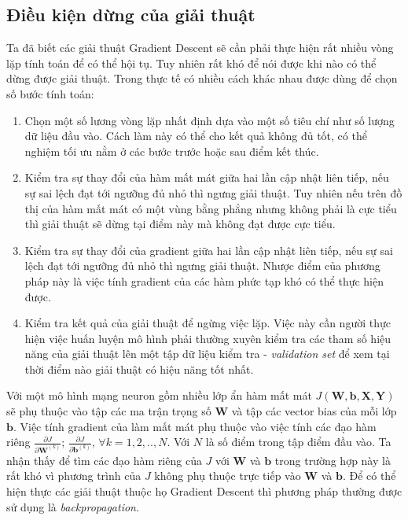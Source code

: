 \subsection{Điều kiện dừng của giải thuật}
Ta đã biết các giải thuật Gradient Descent sẽ cần phải thực hiện rất nhiều vòng lặp tính toán để có thể hội tụ. Tuy nhiên rất khó để nói được khi nào có thể dừng được giải thuật. Trong thực tế có nhiều cách khác nhau được dùng để chọn số bước tính toán:
\begin{enumerate}
	\item Chọn một số lương vòng lặp nhất định dựa vào một số tiêu chí như số lượng dữ liệu đầu vào. Cách làm này có thể cho kết quả không đủ tốt, có thể nghiệm tối ưu nằm ở các bước trước hoặc sau điểm kết thúc.
	\item Kiểm tra sự thay đổi của hàm mất mát giữa hai lần cập nhật liên tiếp, nếu sự sai lệch đạt tới ngưỡng đủ nhỏ thì ngưng giải thuật. Tuy nhiên nếu trên đồ thị của hàm mất mát có một vùng bằng phẳng nhưng không phải là cực tiểu thì giải thuật sẽ dừng tại điểm này mà không đạt được cực tiểu.
	\item Kiểm tra sự thay đổi của gradient giữa hai lần cập nhật liên tiếp, nếu sự sai lệch đạt tới ngưỡng đủ nhỏ thì ngưng giải thuật. Nhược điểm của phương pháp này là việc tính gradient của các hàm phức tạp khó có thể thực hiện được.
	\item Kiểm tra kết quả của giải thuật để ngừng việc lặp. Việc này cần người thực hiện việc huấn luyện mô hình phải thường xuyên kiểm tra các tham số hiệu năng của giải thuật lên một tập dữ liệu kiểm tra - \emph{validation set} để xem tại thời điểm nào giải thuật có hiệu năng tốt nhất.
\end{enumerate}
Với một mô hình mạng neuron gồm nhiều lớp ẩn hàm mất mát $J\left({\boldsymbol{W}},{\boldsymbol{b}},{\boldsymbol{X}},{\boldsymbol{Y}}\right)$ sẽ phụ thuộc vào tập các ma trận trọng số $\boldsymbol{W}$ và tập các vector bias của mỗi lớp $\boldsymbol{b}$. Việc tính gradient của làm mất mát phụ thuộc vào việc tính các đạo hàm riêng ${\frac{{\partial}J}{{{\partial}\boldsymbol{W}}^{(k)}}}$; ${\frac{{\partial}J}{{\partial}\boldsymbol{b}^{(k)}}}$, ${\forall}k=1,2,..,N$. Với $N$ là số điểm trong tập điểm đầu vào. Ta nhận thấy để tìm các đạo hàm riêng của $J$ với ${\boldsymbol{W}}$ và ${\boldsymbol{b}}$ trong trường hợp này là rất khó vì phương trình của $J$ không phụ thuộc trực tiếp vào ${\boldsymbol{W}}$ và ${\boldsymbol{b}}$. Để có thể hiện thực các giải thuật thuộc họ Gradient Descent thì phương pháp thường được sử dụng là \emph{backpropagation}.
